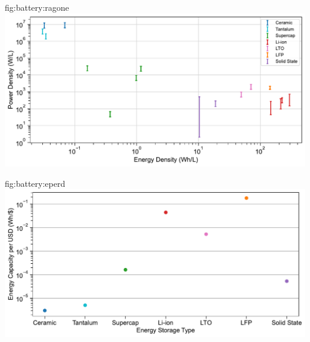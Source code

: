 \begin{definefigure}{fig:battery:ragone}
\centering
\includegraphics[width=\columnwidth]{figs/ragone}
\caption{Ragone plot for components listed in \cref{tab:battery:cost}, in log-log scale. A ragone plot directly compares power and energy density for different devices. Ceramic and tantalum capacitors are very power dense, but provide abysmal energy density. Batteries provide superior energy density, are less power dense. Supercapacitors exist between these two extremes. Even though batteries do not provide comparable power density to either capacitors or supercapacitors, they can still provide sufficient power for common wireless sensor workloads, like operating a short or long range radio.}
\end{definefigure}

\begin{definefigure}{fig:battery:eperd}
\centering
\includegraphics[width=\columnwidth]{figs/energy_per_cost.pdf}
\caption{
    Average energy capacity for various technologies selected in \cref{tab:battery:cost}, normalized by price in USD. Wherever possible, component costs were determined by their price in the United States. In regards to energy capacity, batteries offer 3-5 orders of magnitude more energy capacity per dollar than ceramic and tantalum capacitors. Batteries also offer 2-3 orders of magnitude more capacity than supercapacitors.
}
\end{definefigure}
